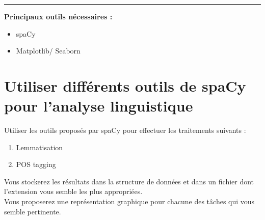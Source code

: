 \newcommand{\numTD}{TD2}
\newcommand{\themeTD}{Analyses morphosyntaxique, lemmatisation et tokenisation}
\newcommand{\file}{toto.tex}



\hrule

\noindent{}
\newline


\textbf{Principaux outils nécessaires :}
\begin{itemize}
  \item spaCy
  \item Matplotlib/ Seaborn

  
\end{itemize}

\section{Utiliser différents outils de spaCy pour l'analyse linguistique}
Utiliser les outils proposés par spaCy pour effectuer les traitements suivants :
\begin{enumerate}
\item Lemmatisation
\item POS tagging
\end{enumerate}
 Vous stockerez les résultats dans la structure de données et dans un fichier dont l'extension vous semble les plus appropriées.\\
 
 Vous proposerez une représentation graphique pour chacune des tâches qui vous semble pertinente.\\

